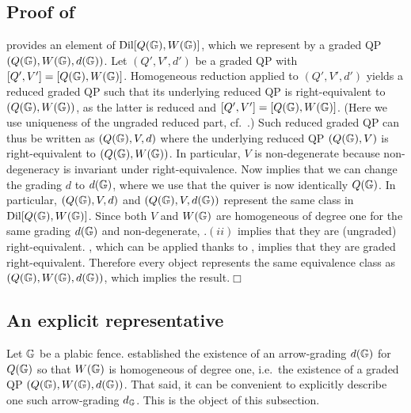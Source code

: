 \subsection{Proof of }\label{ssec:proof_unique-fence-G1}  provides an element of $\operatorname{Dil}[Q(\mathbb G),W(\mathbb G)]$, which we represent by a graded QP $(Q(\mathbb G),W(\mathbb G),d(\mathbb G))$. Let $(Q',V',d')$ be a graded QP with $[Q',V']=[Q(\mathbb G),W(\mathbb G)]$. Homogeneous reduction applied to $(Q',V',d')$ yields a reduced graded QP such that its underlying reduced QP is right-equivalent to $(Q(\mathbb G),W(\mathbb G))$, as the latter is reduced and $[Q',V']=[Q(\mathbb G),W(\mathbb G)]$. (Here we use uniqueness of the ungraded reduced part, cf.~\cite[Theorem~4.6]{DWZ}.) Such reduced graded QP can thus be written as $(Q(\mathbb G),V,d)$ where the underlying reduced QP $(Q(\mathbb G),V)$ is right-equivalent to $(Q(\mathbb G),W(\mathbb G))$. In particular, $V$ is non-degenerate because non-degeneracy is invariant under right-equivalence. Now  implies that we can change the grading $d$ to $d(\mathbb G)$, where we use that the quiver is now identically $Q(\mathbb G)$. In particular, $(Q(\mathbb G),V,d)$ and $(Q(\mathbb G),V,d(\mathbb G))$ represent the same class in $\operatorname{Dil}[Q(\mathbb G),W(\mathbb G)]$. Since both $V$ and $W(\mathbb G)$ are homogeneous of degree one for the same grading $d(\mathbb G)$ and non-degenerate, .$(ii)$ implies that they are (ungraded) right-equivalent. , which can be applied thanks to , implies that they are graded right-equivalent. Therefore every object represents the same equivalence class as $(Q(\mathbb G),W(\mathbb G),d(\mathbb G))$, which implies the result.\hfill$\Box$

\subsection{An explicit representative}\label{ssec:explicit_plabic_gradedQP} Let $\mathbb G$ be a plabic fence.  established the existence of an arrow-grading $d(\mathbb G)$ for $Q(\mathbb G)$ so that $W(\mathbb G)$ is homogeneous of degree one, i.e.~the existence of a graded QP $(Q(\mathbb G),W(\mathbb G),d(\mathbb G))$. That said, it can be convenient to explicitly describe one such arrow-grading $d_\mathbb G$. This is the object of this subsection.\\

